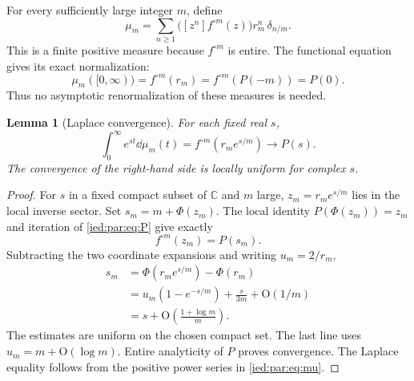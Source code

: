 \documentclass[11pt,letterpaper]{article}
\newtheorem{lemma}[theorem]{Lemma}
\theoremstyle{remark}\newtheorem{remark}[theorem]{Remark}
\newcommand{\C}{\mathbb C}\newcommand{\R}{\mathbb R}
\newcommand{\Oh}{\mathrm O}\newcommand{\supp}{\operatorname{supp}}
\newcommand{\coef}[1]{[z^{#1}]}
\begin{document}
For every sufficiently large integer $m$, define
\begin{equation}\label{ied:par:eq:mu}
 \mu_m=\sum_{n\ge1}
 \bigl(\coef n f^{\circ m}(z)\bigr)r_m^n\,\delta_{n/m}.
\end{equation}
This is a finite positive measure because $f^{\circ m}$ is entire.
The functional equation gives its exact normalization:
\begin{equation}\label{ied:par:eq:mass}
 \mu_m([0,\infty))=f^{\circ m}(r_m)
 =f^{\circ m}(P(-m))=P(0).
\end{equation}
Thus no asymptotic renormalization of these measures is needed.

\begin{lemma}[Laplace convergence]\label{ied:par:lem:laplace}
For each fixed real $s$,
\begin{equation}\label{ied:par:eq:Lapconv}
 \int_0^\infty e^{st}\dd\mu_m(t)
 =f^{\circ m}(r_m e^{s/m})\longrightarrow P(s).
\end{equation}
The convergence of the right-hand side is locally uniform for complex $s$.
\end{lemma}
\begin{proof}
For $s$ in a fixed compact subset of $\C$ and $m$ large,
$z_m=r_m e^{s/m}$ lies in the local inverse sector. Set
$s_m=m+\Phi(z_m)$. The local identity $P(\Phi(z_m))=z_m$ and
iteration of \eqref{ied:par:eq:P} give exactly
\[
 f^{\circ m}(z_m)=P(s_m).
\]
Subtracting the two coordinate expansions and writing $u_m=2/r_m$,
\begin{align*}
 s_m
 &=\Phi(r_m e^{s/m})-\Phi(r_m)\\
 &=u_m(1-e^{-s/m})+\frac{s}{3m}+\Oh(1/m)\\
 &=s+\Oh\!\left(\frac{1+\log m}{m}\right).
\end{align*}
The estimates are uniform on the chosen compact set. The last line
uses $u_m=m+\Oh(\log m)$. Entire analyticity of $P$ proves convergence.
The Laplace equality follows from the positive power series in
\eqref{ied:par:eq:mu}.
\end{proof}
\end{document}
